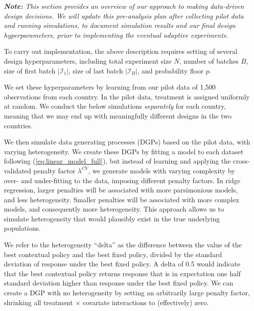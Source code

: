 \documentclass[letterpaper, 12pt, parskip=full,DIV=10]{scrartcl}
\begin{document}
\textit{\textbf{Note:} This section provides an overview of our approach to making data-driven design decisions. We will update this pre-analysis plan \textit{after} collecting pilot data and running simulations, to document simulation results and our final design hyperparameters, prior to implementing the eventual adaptive experiments. }

To carry out implementation, the above description requires setting of several design hyperparameters, including total experiment size $N$, number of batches $B$,  size of first batch $|\mathcal{I}_1|$, size of last batch $|\mathcal{I}_B|$, and probability floor $p$. 

We set these hyperparameters by learning from our pilot data of 1,500 observations from each country. In the pilot data, treatment is assigned uniformly at random. We conduct the below simulations \textit{separately} for each country, meaning that we may end up with meaningfully different designs in the two countries. 

We then simulate data generating processes (DGPs) based on the pilot data, with varying heterogeneity. We create these DGPs by fitting a model to each dataset following (\ref{eq:linear_model_full}), but instead of learning and applying the cross-validated penalty factor $\lambda^{CV}$, we generate models with varying complexity by over- and under-fitting to the data, imposing different penalty factors. In ridge regression, larger penalties will be associated with more parsimonious models, and less heterogeneity. Smaller penalties will be associated with more complex models, and consequently more heterogeneity. This approach allows us to simulate heterogeneity that would plausibly exist in the true underlying populations. 

We refer to the heterogeneity ``delta'' as the difference between the value of the best contextual policy and the best fixed policy, divided by the standard deviation of response under the best fixed policy. A delta of 0.5 would indicate that the best contextual policy returns response that is in expectation one half standard deviation higher than response under the best fixed policy. We can create a DGP with no heterogeneity by setting an arbitrarily large penalty factor, shrinking all treatment $\times$ covariate interactions to (effectively) zero. 
\end{document}
